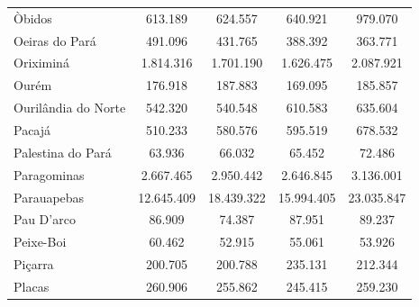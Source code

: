 \begin{table}[H]
{\begin{tabular}{l|c|c|c|c}
   Òbidos                 &  613.189   &  624.557   & 640.921    & 979.070      \\
   Oeiras do Pará         &  491.096   &  431.765   & 388.392    &  363.771     \\
   Oriximiná              &  1.814.316 &  1.701.190 & 1.626.475  &  2.087.921    \\
   Ourém                  &  176.918   &  187.883   & 169.095    & 185.857       \\
   Ourilândia do Norte    & 542.320    &  540.548   & 610.583    & 635.604       \\
   Pacajá                 & 510.233    &  580.576   & 595.519    & 678.532       \\
   Palestina do Pará      & 63.936     &  66.032    & 65.452     & 72.486        \\
   Paragominas            & 2.667.465  &  2.950.442 & 2.646.845  & 3.136.001      \\
   Parauapebas            & 12.645.409 &  18.439.322 & 15.994.405 &  23.035.847   \\
   Pau D'arco             & 86.909     &   74.387    &  87.951    & 89.237        \\
   Peixe-Boi              & 60.462     &   52.915    &  55.061    & 53.926   \\
   Piçarra                & 200.705    &   200.788   & 235.131    & 212.344   \\
   Placas                 & 260.906    &   255.862   &  245.415   & 259.230   \\
   \hline
\end{tabular}}
\end{table}


